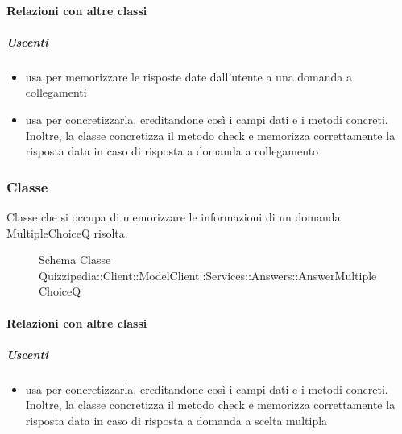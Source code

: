 \paragraph{Relazioni con altre classi}
\subparagraph{Uscenti}
\begin{itemize}
\item usa  per memorizzare le risposte date dall'utente a una domanda a collegamenti
\item usa  per concretizzarla, ereditandone così i campi dati e i metodi concreti. Inoltre, la classe concretizza il metodo check e memorizza correttamente la risposta data in caso di risposta a domanda a collegamento
\end{itemize}
\subsubsection{Classe }
Classe che si occupa di memorizzare le informazioni di un domanda MultipleChoiceQ risolta.
\begin{figure}[H]
\centering
\noindent{}
\caption[Schema Classe AnswerMultipleChoiceQ]{Schema Classe Quizzipedia::Client::ModelClient::Services::Answers::AnswerMultipleChoiceQ}
\end{figure}
\paragraph{Relazioni con altre classi}
\subparagraph{Uscenti}
\begin{itemize}
\item usa  per concretizzarla, ereditandone così i campi dati e i metodi concreti. Inoltre, la classe concretizza il metodo check e memorizza correttamente la risposta data in caso di risposta a domanda a scelta multipla
\end{itemize}
